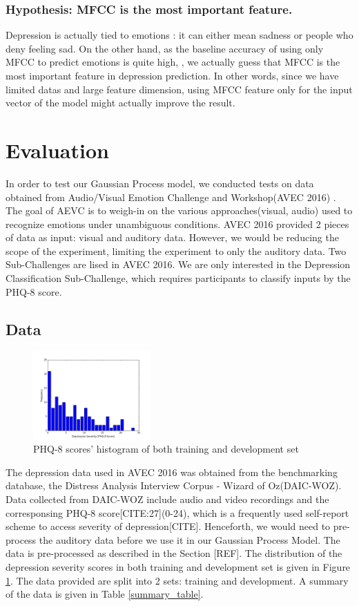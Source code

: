 \documentclass{article}
\begin{document}
	\subsubsection{Hypothesis: MFCC is the most important feature.}
	Depression is actually tied to emotions : it can either mean sadness or people who deny feeling sad. \cite{Stratou2015} 
	On the other hand, as the baseline accuracy of using only MFCC to predict emotions is quite high, \cite{ElAyadi2011}, 
	we actually guess that MFCC is the most important feature in depression prediction. 
	In other words, since we have limited datas and large feature dimension, 
	using MFCC feature only for the input vector of the model might actually improve the result.

	\section{Evaluation}
	In order to test our Gaussian Process model, we conducted tests on data obtained from Audio/Visual Emotion Challenge and Workshop(AVEC 2016) \cite{avec2016}. The goal of AEVC is to weigh-in on the various approaches(visual, audio) used to recognize emotions under unambiguous conditions. AVEC 2016 provided 2 pieces of data as input: visual and auditory data. However, we would be reducing the scope of the experiment, limiting the experiment to only the auditory data. Two Sub-Challenges are lised in AVEC 2016. We are only interested in the Depression Classification Sub-Challenge, which requires participants to classify inputs by the PHQ-8 score.

	\subsection{Data}
	\begin{figure}[h]
 	\includegraphics[width=0.40\textwidth]{histogram_phq8}
	\caption{PHQ-8 scores' histogram of both training and development set}
	\label{histogram_phq8}
	\end{figure}
	
	The depression data used in AVEC 2016 was obtained from the benchmarking database, the Distress Analysis Interview Corpus - Wizard of Oz(DAIC-WOZ). Data collected from DAIC-WOZ include audio and video recordings and the corresponsing PHQ-8 score[CITE:27](0-24), which is a frequently used self-report scheme to access severity of depression[CITE]. Henceforth, we would need to pre-process the auditory data before we use it in our Gaussian Process Model. The data is pre-processed as described in the Section [REF]. The distribution of the depression severity scores in both training and development set is given in Figure \ref{histogram_phq8}. The data provided are split into 2 sets: training and development. A summary of the data is given in Table \ref{summary_table}.
\end{document}
